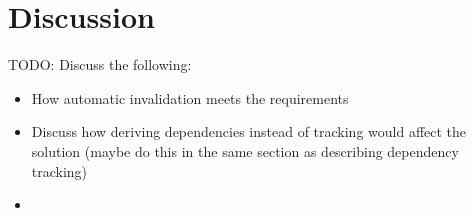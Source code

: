 

\section{Discussion}
\label{sec:invalidation-discussion}

TODO: Discuss the following:

\begin{itemize}
  \item How automatic invalidation meets the requirements
  \item Discuss how deriving dependencies instead of tracking would affect the solution (maybe do this in the same section as describing dependency tracking)
  \item
\end{itemize}










